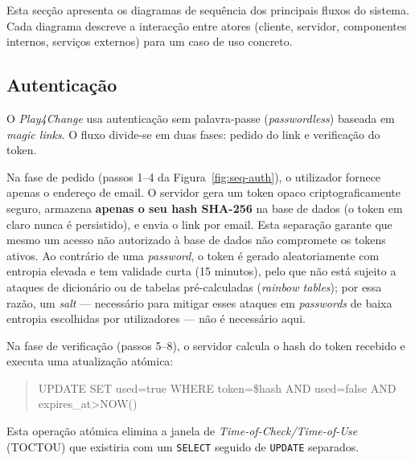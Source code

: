 Esta sec\c{c}\~ao apresenta os diagramas de sequ\^encia dos principais fluxos
do sistema. Cada diagrama descreve a interac\c{c}\~ao entre atores (cliente,
servidor, componentes internos, servi\c{c}os externos) para um caso de uso
concreto.

\subsection{Autentica\c{c}\~ao}
\label{ssec:seq-auth}

O \emph{Play4Change} usa autentica\c{c}\~ao sem palavra-passe (\emph{passwordless})
baseada em \emph{magic links}. O fluxo divide-se em duas fases: pedido do link
e verifica\c{c}\~ao do token.

Na fase de pedido (passos 1--4 da Figura~\ref{fig:seq-auth}), o utilizador
fornece apenas o endere\c{c}o de email. O servidor gera um token opaco
criptograficamente seguro, armazena \textbf{apenas o seu hash SHA-256} na
base de dados (o token em claro nunca \'e persistido), e envia o link por
email. Esta separa\c{c}\~ao garante que mesmo um acesso n\~ao autorizado \`a
base de dados n\~ao compromete os tokens ativos. Ao contr\'ario de uma
\emph{password}, o token \'e gerado aleatoriamente com entropia elevada e
tem validade curta (15 minutos), pelo que n\~ao est\'a sujeito a ataques de
dicion\'ario ou de tabelas pr\'e-calculadas (\emph{rainbow tables}); por
essa raz\~ao, um \emph{salt} --- necess\'ario para mitigar esses ataques em
\emph{passwords} de baixa entropia escolhidas por utilizadores --- n\~ao
\'e necess\'ario aqui.

Na fase de verifica\c{c}\~ao (passos 5--8), o servidor calcula o hash do
token recebido e executa uma atualiza\c{c}\~ao at\'omica:
\begin{quote}
\footnotesize\ttfamily UPDATE SET used=true WHERE token=\$hash AND used=false AND expires\_at>NOW()
\end{quote}
Esta opera\c{c}\~ao at\'omica elimina a janela de
\emph{Time-of-Check/Time-of-Use} (TOCTOU) que existiria com um
\texttt{SELECT} seguido de \texttt{UPDATE} separados.

